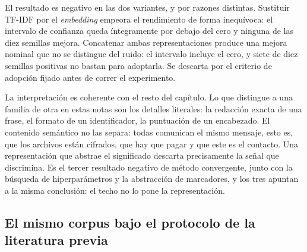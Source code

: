 \begin{table}[ht]
\centering
\caption{Representación semántica multilingüe frente a TF-IDF (155 notas, P2, 10 semillas)}
\label{tab:embeddings}
\end{table}

El resultado es negativo en las dos variantes, y por razones distintas. Sustituir TF-IDF por el \textit{embedding} empeora el rendimiento de forma inequívoca: el intervalo de confianza queda íntegramente por debajo del cero y ninguna de las diez semillas mejora. Concatenar ambas representaciones produce una mejora nominal que no se distingue del ruido: el intervalo incluye el cero, y siete de diez semillas positivas no bastan para adoptarla. Se descarta por el criterio de adopción fijado antes de correr el experimento.

La interpretación es coherente con el resto del capítulo. Lo que distingue a una familia de otra en estas notas son los detalles literales: la redacción exacta de una frase, el formato de un identificador, la puntuación de un encabezado. El contenido semántico no las separa: todas comunican el mismo mensaje, esto es, que los archivos están cifrados, que hay que pagar y que este es el contacto. Una representación que abstrae el significado descarta precisamente la señal que discrimina. Es el tercer resultado negativo de método convergente, junto con la búsqueda de hiperparámetros y la abstracción de marcadores, y los tres apuntan a la misma conclusión: el techo no lo pone la representación.

\subsection{El mismo corpus bajo el protocolo de la literatura previa}
\label{subsec:res_lemmou}

